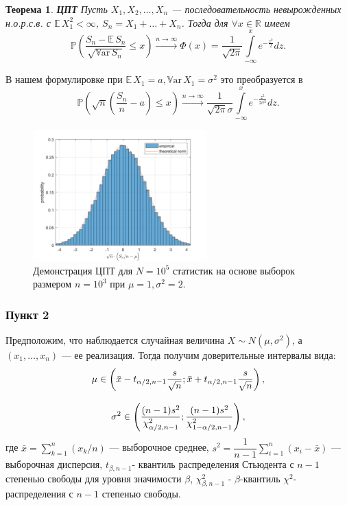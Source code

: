 \documentclass[oneside, final, 12pt]{article}
\def\Var{{\mathbb{V}\textrm{ar}}\,}
\def\E{{\mathbb{E} }\,}
\def\P{{\mathbb{P} }}
\newtheorem{theorem}{Теорема}
\begin{document}
	\newpage
 	\begin{theorem}{\textbf{ЦПТ}}
	    \newline
        Пусть $X_1, X_2, \ldots, X_n$ --- последовательность невырожденных н.о.р.с.в.  
		с $\E X_1^2<\infty$, $S_n = X_1 + \ldots + X_n$. Тогда для $\forall x \in \mathbb{R}$ имеем
        $$
            \P\left(\frac{S_n-\E S_n}{\sqrt{\Var S_n}}\leqslant x\right) 
            \xrightarrow[]{n \rightarrow \infty} \Phi(x) = \frac{1}{\sqrt{2\pi}}
                                \int\limits^{x}_{-\infty}e^{-\frac{z^2}{2}}dz.
        $$
	 \end{theorem}
	В нашем формулировке при $ \E X_1 = a, \Var X_1 = \sigma^2 $ это преобразуется в 
	$$
		\P\left(\sqrt{n}\left(\frac{S_n}{n} -a\right) \leqslant x\right) 
            \xrightarrow[]{n \rightarrow \infty} \frac{1}{\sqrt{2\pi}\sigma}
                                \int\limits^{x}_{-\infty}e^{-\frac{z^2}{2\sigma^2}}dz.
	$$
   
	\begin{figure}[h!]
		\centering
		\includegraphics[width=0.6\textwidth]{../code/Task_5/pict/CTL_ex.png}
		\caption{\centering Демонстрация ЦПТ для $N=10^5$ статистик на основе выборок размером $n=10^3$
							\newline при $\mu=1, \sigma^2=2 $.}
    \end{figure}

\subsubsection{Пункт 2}
	
	Предположим, что наблюдается случайная величина $X\sim N(\mu,\sigma^2)$, а $(x_1,\ldots,x_n)$ --- 
	ее реализация. Тогда получим доверительные интервалы вида:
	$$
	\begin{gathered}
		\mu \in \left(\bar{x} - t_{\alpha/2, n-1}\frac{s}{\sqrt{n}};
							 \bar{x} + t_{\alpha/2, n-1}\frac{s}{\sqrt{n}}\right), \vspace{3mm} \\
		\sigma^2 \in \left(\dfrac{(n-1)s^2}{\chi^2_{\alpha/2, n-1}};\dfrac{(n-1)s^2}{\chi^2_{1-\alpha/2, n-1}}	\right),
	\end{gathered}
	$$
	где $\bar{x}=\sum\limits_{k=1}^{n}(x_k/n)$ --- выборочное среднее,
	$s^2 = \dfrac{1}{n-1}\sum\limits_{i=1}^{n}(x_i - \bar{x})$ --- выборочная дисперсия,	\newline
	$t_{\beta, n-1}$-  квантиль 
	распределения Стьюдента с $n-1$ степенью свободы для уровня значимости $\beta$, 
	$\chi^2_{\beta,n-1}$ -  $\beta$-квантиль $\chi^2$- распределения с $n-1$ степенью свободы.
	\newline 
\end{document}
